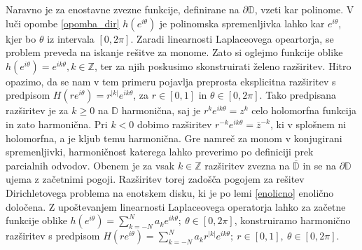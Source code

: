 \documentclass[mat1, tisk]{fmfdelo}
\begin{document}
    Naravno je za enostavne zvezne funkcije, definirane na $\partial \mathbb{D}$, vzeti kar polinome. V luči opombe \ref{opomba_dir} $h(e^{i\theta})$ je polinomska spremenljivka lahko kar $e^{i\theta}$, kjer bo $\theta$ iz intervala $[0,2\pi]$. 
    Zaradi linearnosti Laplaceovega opeartorja, se problem preveda na iskanje rešitve za monome. 
    Zato si oglejmo funkcije oblike $h(e^{i \theta}) = e^{i k \theta}, k \in \mathbb{Z}$, ter za njih poskusimo skonstruirati želeno razširitev. 
    Hitro opazimo, da se nam v tem primeru pojavlja preprosta eksplicitna razširitev s predpisom $H(r e^{i \theta}) = r^{|k|}e^{i k \theta}$, za \mbox{$r \in [0, 1]$} in $\theta \in [0, 2\pi]$. 
    Tako predpisana razširitev je za $k \geq 0$ na $\mathbb{D}$ harmonična, saj je $r^k e^{ik\theta} = z^k$ celo holomorfna funkcija in zato harmonična. Pri $k < 0$ dobimo razširitev $r^{-k} e^{ik\theta} = \overline{z}^{-k}$, ki v splošnem ni holomorfna, a je \mbox{kljub} temu harmonična. 
    Gre namreč za monom v konjugirani spremenljivki, harmoničnost katerega lahko preverimo po definiciji prek parcialnih odvodov.
    Obenem je za vsak $k \in \mathbb{Z}$ razširitev zvezna na $\overline{\mathbb{D}}$ in se na $\partial \mathbb{D}$ ujema z začetnimi pogoji. Razširitev torej zadošča pogojem za rešitev Dirichletovega problema na enotskem disku, ki je po lemi \ref{enolicno} enolično določena. 
    Z upoštevanjem linearnosti Laplaceovega operatorja lahko za začetne funkcije oblike $h(e^{i\theta}) = \sum_{k = -N}^{N}{a_k e^{ik\theta}};~\theta \in [0,2\pi]$, konstruiramo harmonično razširitev s predpisom
    $H(r e^{i \theta}) = \sum_{k = -N}^{N}{a_k r^{|k|}e^{ik\theta}};~r \in [0,1],~\theta \in [0,2\pi]$. 
    
\end{document}
